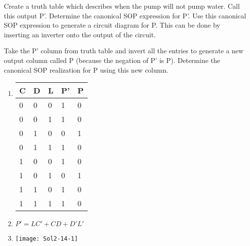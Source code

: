 \begin{enumerate}
                        Create a truth table which describes when the pump will not
                        pump water.  Call this output P'.  Determine the canonical SOP
                        expression for P'.  Use this canonical SOP expression to generate
                        a circuit diagram for P.  This can be done by inserting an
                        inverter onto the output of the circuit.

                        Take the P' column from truth table and invert all the entries
                        to generate a new output column called P (because
                        the negation of P' is P).  Determine the canonical SOP
                        realization for P using this new column.

                        {\color{blue}
                            \begin{onlysolution}
                                \begin{enumerate}
                                    \item
                                        \begin{tabular}{l|l|l||l|l}
                                            C & D & L &  P'& P \\ \hline \rowcolor{gray!15}
                                            0 & 0 & 0 &  1 & 0 \\ \hline
                                            0 & 0 & 1 &  1 & 0 \\ \hline \rowcolor{gray!15}
                                            0 & 1 & 0 &  0 & 1 \\ \hline
                                            0 & 1 & 1 &  1 & 0 \\ \hline \rowcolor{gray!15}
                                            1 & 0 & 0 &  1 & 0 \\ \hline
                                            1 & 0 & 1 &  0 & 1 \\ \hline \rowcolor{gray!15}
                                            1 & 1 & 0 &  1 & 0 \\ \hline
                                            1 & 1 & 1 &  1 & 0 \\
                                        \end{tabular}
                                    \item $P'=LC'+CD+D'L'$
                                    \item \texttt{[image: Sol2-14-1]}

\end{enumerate}
\end{onlysolution}}
\end{enumerate}
